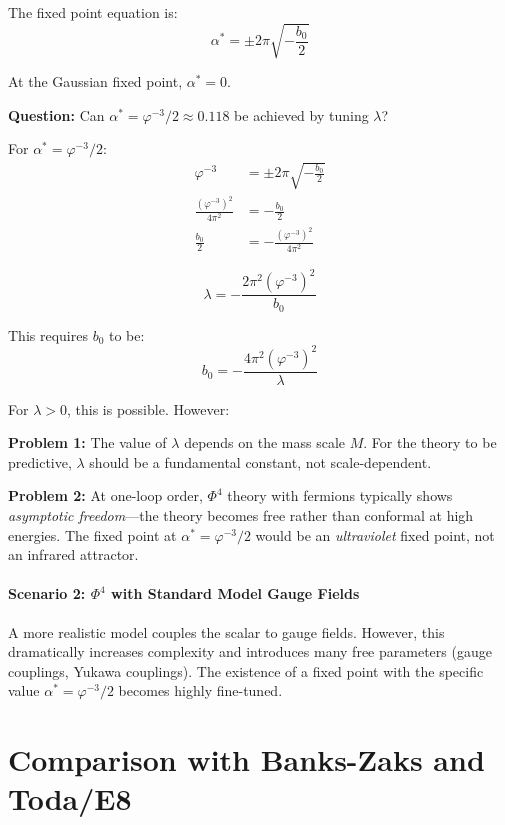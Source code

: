 \documentclass{article}
\begin{document}
The fixed point equation is:
\begin{equation}
  \alpha^* = \pm 2\pi\sqrt{-\frac{b_0}{2}}
  \label{eq:fp-scalar}
\end{equation}

At the Gaussian fixed point, $\alpha^* = 0$.

\textbf{Question:} Can $\alpha^* = \varphi^{-3}/2 \approx 0.118$ be achieved by tuning $\lambda$?

For $\alpha^* = \varphi^{-3}/2$:
\begin{align}
  \varphi^{-3} &= \pm 2\pi\sqrt{-\frac{b_0}{2}} \\
  \frac{(\varphi^{-3})^2}{4\pi^2} &= -\frac{b_0}{2} \\
  \frac{b_0}{2} &= -\frac{(\varphi^{-3})^2}{4\pi^2}
\end{align}

\begin{equation}
  \lambda = -\frac{2\pi^2 (\varphi^{-3})^2}{b_0}
  \label{eq:lambda-scalar}
\end{equation}

This requires $b_0$ to be:
\begin{equation}
  b_0 = -\frac{4\pi^2 (\varphi^{-3})^2}{\lambda}
\end{equation}

For $\lambda > 0$, this is possible. However:

\textbf{Problem 1:} The value of $\lambda$ depends on the mass scale $M$. For the theory to be predictive, $\lambda$ should be a fundamental constant, not scale-dependent.

\textbf{Problem 2:} At one-loop order, $\Phi^4$ theory with fermions typically shows \emph{asymptotic freedom}---the theory becomes free rather than conformal at high energies. The fixed point at $\alpha^* = \varphi^{-3}/2$ would be an \emph{ultraviolet} fixed point, not an infrared attractor.

\paragraph{Scenario 2: $\Phi^4$ with Standard Model Gauge Fields}

A more realistic model couples the scalar to gauge fields. However, this dramatically increases complexity and introduces many free parameters (gauge couplings, Yukawa couplings). The existence of a fixed point with the specific value $\alpha^* = \varphi^{-3}/2$ becomes highly fine-tuned.

\section{Comparison with Banks-Zaks and Toda/E8}
\end{document}
